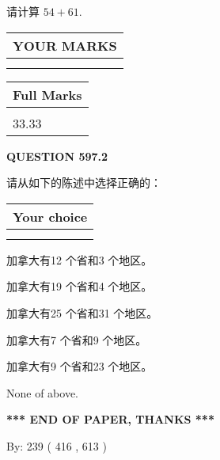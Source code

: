 \documentclass{ctexart}
\begin{document}
  
 
请计算 $ %
54 +  %
61 $.
 

 

 
  
\vspace{0.2in}
  
\noindent\begin{tabular}{|l|}
\hline
 YOUR MARKS  \\
\hline
 \\ 
 \\ 
\hline
\end{tabular}
\hspace{0.05in} \begin{tabular}{|l|}
\hline
 Full Marks  \\
\hline
 \\ 
33.33 \\
\hline
\end{tabular}
{\textbf{\Large{QUESTION
597.2 
}}}
  
  
请从如下的陈述中选择正确的：
  
  
\noindent\hspace{3.0in} \begin{tabular}{|l|}
\hline
Your choice \\
\hline
 \\ 
 \\ 
\hline
\end{tabular}
  
  
 
 
加拿大有12 个省和3 个地区。
 
 
加拿大有19 个省和4 个地区。
 
 
加拿大有25 个省和31 个地区。
 
 
加拿大有7 个省和9 个地区。
 
 
加拿大有9 个省和23 个地区。
 
 
 None of above.
 
 
   
   
 \vspace{0.2in}
 
   
   
   
   
\vspace{1.0in} 
{\textbf{\large{ *** END OF PAPER, THANKS *** }}} 
   
   
\hspace{1.0in} By: 
 239 ( 416 ,  613 )
   
\end{document}
